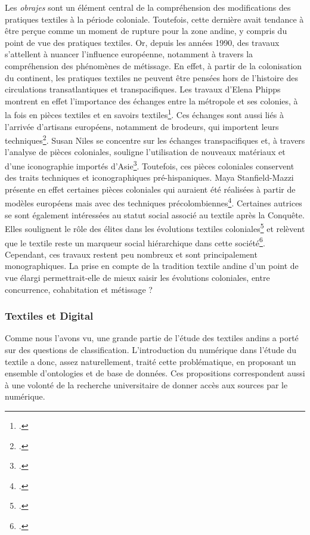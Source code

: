 Les \textit{obrajes} sont un élément central de la compréhension des modifications des pratiques textiles à la période coloniale. Toutefois, cette dernière avait tendance à être perçue comme un moment de rupture pour la zone andine, y compris du point de vue des pratiques textiles. Or, depuis les années 1990, des travaux s'attellent à nuancer l'influence européenne, notamment à travers la compréhension des phénomènes de métissage. En effet, à partir de la colonisation du continent, les pratiques textiles ne peuvent être pensées hors de l'histoire des circulations transatlantiques et transpacifiques. Les travaux d'Elena Phipps montrent en effet l'importance des échanges entre la métropole et ses colonies, à la fois en pièces textiles et en savoirs textiles\footcite{phippsIberianGlobe2013}. Ces échanges sont aussi liés à l'arrivée d'artisans européens, notamment de brodeurs, qui importent leurs techniques\footcite[p.~36]{phippsIberianGlobe2013}. Susan Niles se concentre sur les échanges transpacifiques et, à travers l'analyse de pièces coloniales, souligne l'utilisation de nouveaux matériaux et d'une iconographie importés d'Asie\footcite[(p.~60)]{nilesArtistEmpireInca1994}. Toutefois, ces pièces coloniales conservent des traits techniques et iconographiques pré-hispaniques. Maya Stanfield-Mazzi présente en effet certaines pièces coloniales qui auraient été réalisées à partir de modèles européens mais avec des techniques précolombiennes\footcite{stanfield-mazziCreatividadArteAndino2020}. Certaines autrices se sont également intéressées au statut social associé au textile après la Conquête. Elles soulignent le rôle des élites dans les évolutions textiles coloniales\footcite{solorzanogonzalesTapizAndinoNobleza2020} et relèvent que le textile reste un marqueur social hiérarchique dans cette société\footcite{ramosTejidosSociedadColonial2010}. Cependant, ces travaux restent peu nombreux et sont principalement monographiques. La prise en compte de la tradition textile andine d'un point de vue élargi permettrait-elle de mieux saisir les évolutions coloniales, entre concurrence, cohabitation et métissage ?


\subsubsection*{Textiles et Digital}

Comme nous l'avons vu, une grande partie de l'étude des textiles andins a porté sur des questions de classification. L'introduction du numérique dans l'étude du textile a donc, assez naturellement, traité cette problématique, en proposant un ensemble d'ontologies et de base de données. Ces propositions correspondent aussi à une volonté de la recherche universitaire de donner accès aux sources par le numérique.\\


